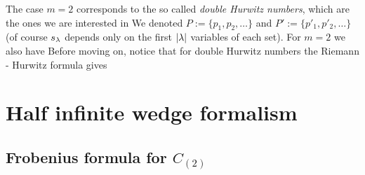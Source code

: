 \documentclass[10pt,handout]{beamer} %
\begin{document}
\begin{frame}

The case $m=2$ corresponds to the so called \emph{double Hurwitz numbers}, which are the ones we are interested in
We denoted $P:=\{p_1,p_2,\ldots\}$ and $P':=\{p'_1,p'_2,\ldots\}$ (of course $s_\lambda$ depends only on the first $|\lambda|$ variables of each set). \pause For $m=2$ we also have
\pause
Before moving on, notice that for double Hurwitz numbers the Riemann - Hurwitz formula gives

\end{frame}

\section{Half infinite wedge formalism}

\subsection[Frobenius formula for $C\raisebox{-1pt}{\tiny(2)}$]{Frobenius formula for $C_{(2)}$}
\end{document}
